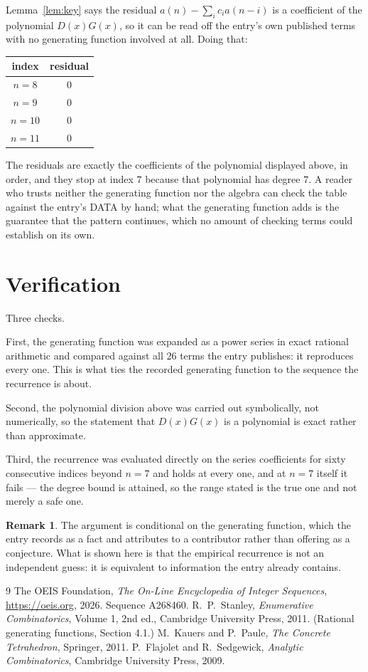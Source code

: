 \documentclass[11pt,a4paper]{article}
\theoremstyle{plain}
\theoremstyle{definition}
\newtheorem{remark}[theorem]{Remark}
\begin{document}
Lemma~\ref{lem:key} says the residual $a(n)-\sum_ic_ia(n-i)$ is a coefficient of the
polynomial $D(x)G(x)$, so it can be read off the entry's own published terms with no
generating function involved at all. Doing that:
\begin{center}
\begin{tabular}{cc}
index & residual \\ \hline
$n=8$ & $0$ \\
$n=9$ & $0$ \\
$n=10$ & $0$ \\
$n=11$ & $0$
\end{tabular}
\end{center}
The residuals are exactly the coefficients of the polynomial displayed above, in order, and
they stop at index $7$ because that polynomial has degree $7$. A reader who trusts
neither the generating function nor the algebra can check the table against the entry's DATA
by hand; what the generating function adds is the guarantee that the pattern continues, which
no amount of checking terms could establish on its own.

\section{Verification}

Three checks.

First, the generating function was expanded as a power series in exact rational arithmetic and
compared against all $26$ terms the entry publishes: it reproduces every one. This is
what ties the recorded generating function to the sequence the recurrence is about.

Second, the polynomial division above was carried out symbolically, not numerically, so the
statement that $D(x)G(x)$ is a polynomial is exact rather than approximate.

Third, the recurrence was evaluated directly on the series coefficients for sixty consecutive
indices beyond $n=7$ and holds at every one, and at $n=7$ itself it fails --- the
degree bound is attained, so the range stated is the true one and not merely a safe one.

\begin{remark}
The argument is conditional on the generating function, which the entry records as a fact and
attributes to a contributor rather than offering as a conjecture. What is shown here is that
the empirical recurrence is not an independent guess: it is equivalent to information the
entry already contains.
\end{remark}

\begin{thebibliography}{9}
 The OEIS Foundation, \emph{The On-Line Encyclopedia of Integer
Sequences}, \url{https://oeis.org}, 2026. Sequence A268460.
 R.~P.~Stanley, \emph{Enumerative Combinatorics}, Volume 1, 2nd ed.,
Cambridge University Press, 2011. (Rational generating functions, Section 4.1.)
 M.~Kauers and P.~Paule, \emph{The Concrete Tetrahedron}, Springer, 2011.
 P.~Flajolet and R.~Sedgewick, \emph{Analytic Combinatorics}, Cambridge
University Press, 2009.
\end{thebibliography}
\end{document}
